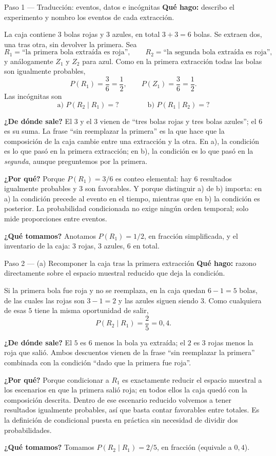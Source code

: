 \documentclass[11pt]{article}
\begin{document}
\begin{paso}{Paso 1 --- Traducción: eventos, datos e incógnitas}
\textbf{Qué hago:} describo el experimento y nombro los eventos de cada extracción.

La caja contiene $3$ bolas rojas y $3$ azules, en total $3+3=6$ bolas. Se extraen dos, una tras otra, sin devolver la primera. Sea
\[
R_1=\text{``la primera bola extraída es roja''},\qquad
R_2=\text{``la segunda bola extraída es roja''},
\]
y análogamente $Z_1$ y $Z_2$ para azul. Como en la primera extracción todas las bolas son igualmente probables,
\[
P(R_1)=\frac{3}{6}=\frac{1}{2},\qquad P(Z_1)=\frac{3}{6}=\frac{1}{2}.
\]
Las incógnitas son
\[
\text{a) } P(R_2\mid R_1)=?
\qquad\qquad
\text{b) } P(R_1\mid R_2)=?
\]

\textbf{¿De dónde sale?} El $3$ y el $3$ vienen de ``tres bolas rojas y tres bolas azules''; el $6$ es su suma. La frase ``sin reemplazar la primera'' es la que hace que la composición de la caja cambie entre una extracción y la otra. En a), la condición es lo que pasó en la primera extracción; en b), la condición es lo que pasó en la \emph{segunda}, aunque preguntemos por la primera.

\textbf{¿Por qué?} Porque $P(R_1)=3/6$ es conteo elemental: hay $6$ resultados igualmente probables y $3$ son favorables. Y porque distinguir a) de b) importa: en a) la condición precede al evento en el tiempo, mientras que en b) la condición es posterior. La probabilidad condicionada no exige ningún orden temporal; solo mide proporciones entre eventos.

\textbf{¿Qué tomamos?} Anotamos $P(R_1)=1/2$, en fracción simplificada, y el inventario de la caja: $3$ rojas, $3$ azules, $6$ en total.
\end{paso}

\begin{paso}{Paso 2 --- (a) Recomponer la caja tras la primera extracción}
\textbf{Qué hago:} razono directamente sobre el espacio muestral reducido que deja la condición.

Si la primera bola fue roja y no se reemplaza, en la caja quedan $6-1=5$ bolas, de las cuales las rojas son $3-1=2$ y las azules siguen siendo $3$. Como cualquiera de esas $5$ tiene la misma oportunidad de salir,
\[
P(R_2\mid R_1)=\frac{2}{5}=0{,}4.
\]

\textbf{¿De dónde sale?} El $5$ es $6$ menos la bola ya extraída; el $2$ es $3$ rojas menos la roja que salió. Ambos descuentos vienen de la frase ``sin reemplazar la primera'' combinada con la condición ``dado que la primera fue roja''.

\textbf{¿Por qué?} Porque condicionar a $R_1$ es exactamente reducir el espacio muestral a los escenarios en que la primera salió roja; en todos ellos la caja quedó con la composición descrita. Dentro de ese escenario reducido volvemos a tener resultados igualmente probables, así que basta contar favorables entre totales. Es la definición de condicional puesta en práctica sin necesidad de dividir dos probabilidades.

\textbf{¿Qué tomamos?} Tomamos $P(R_2\mid R_1)=2/5$, en fracción (equivale a $0{,}4$).
\end{paso}
\end{document}
